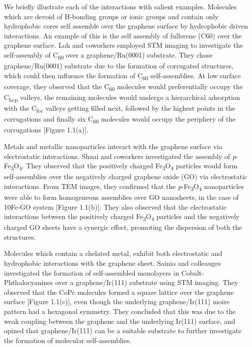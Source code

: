 We briefly illustrate each of the interactions with salient examples. Molecules which are devoid of H-bonding groups or ionic groups and contain only hydrophobic cores self assemble over the graphene surface by hydrophobic driven interactions. An example of this is the self assembly of fullerene (C60) over the graphene surface. Loh and coworkers employed STM imaging to investigate the self-assembly of C\textsubscript{60} over a graphene/Ru(0001) substrate.\supercite{lu_using_2012} They chose graphene/Ru(0001) substrate due to the formation of corrugated structures, which could then influence the formation of C\textsubscript{60} self-assemblies. At low surface coverage, they observed that the C\textsubscript{60} molecules would preferentially occupy the C\textsubscript{hcp} valleys, the remaining molecules would undergo a hierarchical adsorption with the C\textsubscript{fcc} valleys getting filled next, followed by the highest points in the corrugations and finally six C\textsubscript{60} molecules would occupy the periphery of the corrugations [Figure 1.1(a)]. 

Metals and metallic nanoparticles interact with the graphene surface via electrostatic interactions. Shuai and coworkers investigated the assembly of \textit{p}-Fe\textsubscript{3}O\textsubscript{4}.\supercite{yang_electrostatic_2020}  They observed that the positively charged Fe\textsubscript{3}O\textsubscript{4} particles would form self-assemblies over the negatively charged graphene oxide (GO) via electrostatic interactions. From TEM images, they confirmed that the \textit{p}-Fe\textsubscript{3}O\textsubscript{4} nanoparticles were able to form homogeneous assemblies over GO nanosheets, in the case of 10Fe-GO system [Figure 1.1(b)]. They also observed that the electrostatic interactions between the positively charged Fe\textsubscript{3}O\textsubscript{4} particles and the negatively charged GO sheets have a synergic effect, promoting the dispersion of both the structures.

Molecules which contain a chelated metal, exhibit both electrostatic and hydrophobic interactions with the graphene sheet. Sainio and colleauges investigated the formation of self-assembled monolayers in Cobalt-Phthalocyanines over a graphene/Ir(111) substrate using STM imaging.\supercite{hamalainen_self-assembly_2012} They observed that the CoPc molecules formed a square lattice over the graphene surface [Figure 1.1(c)], even though the underlying graphene/Ir(111) moire pattern had a hexagonal symmetry. They concluded that this was due to the weak coupling between the graphene and the underlying Ir(111) surface, and opined that graphene/Ir(111) can be a suitable substrate to further investigate the formation of molecular self-assemblies.

